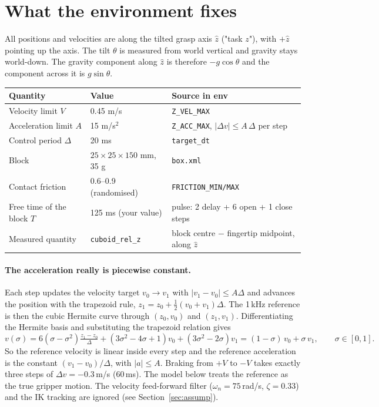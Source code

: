 \documentclass[11pt,a4paper]{article}
\newcommand{\code}[1]{\texttt{#1}}
\begin{document}
\section{What the environment fixes}
All positions and velocities are along the tilted grasp axis $\hat z$ ("task $z$"), with $+\hat z$ pointing up the axis.
The tilt $\theta$ is measured from world vertical and gravity stays world-down. The gravity component along $\hat z$
is therefore $-g\cos\theta$ and the component across it is $g\sin\theta$.

\begin{center}
\begin{tabular}{lll}
\toprule
Quantity & Value & Source in env \\
\midrule
Velocity limit $V$ & 0.45 m/s & \code{Z\_VEL\_MAX} \\
Acceleration limit $A$ & 15 m/s$^2$ & \code{Z\_ACC\_MAX}, $|\Delta v|\le A\,\Delta$ per step \\
Control period $\Delta$ & 20 ms & \code{target\_dt} \\
Block & $25\times25\times150$ mm, 35 g & \code{box.xml} \\
Contact friction & 0.6--0.9 (randomised) & \code{FRICTION\_MIN/MAX} \\
Free time of the block $T$ & 125 ms (your value) & pulse: 2 delay + 6 open + 1 close steps \\
Measured quantity & \code{cuboid\_rel\_z} & block centre $-$ fingertip midpoint, along $\hat z$ \\
\bottomrule
\end{tabular}
\end{center}

\paragraph{The acceleration really is piecewise constant.}
Each step updates the velocity target $v_0\to v_1$ with $|v_1-v_0|\le A\Delta$ and advances the position with the
trapezoid rule, $z_1=z_0+\tfrac12(v_0+v_1)\Delta$. The 1\,kHz reference is then the cubic Hermite curve through
$(z_0,v_0)$ and $(z_1,v_1)$. Differentiating the Hermite basis and substituting the trapezoid relation gives
\[
  v(\sigma) = 6(\sigma-\sigma^2)\tfrac{z_1-z_0}{\Delta} + (3\sigma^2-4\sigma+1)v_0 + (3\sigma^2-2\sigma)v_1
            = (1-\sigma)\,v_0 + \sigma\,v_1 ,\qquad \sigma\in[0,1].
\]
So the reference velocity is linear inside every step and the reference acceleration is the constant $(v_1-v_0)/\Delta$,
with $|a|\le A$. Braking from $+V$ to $-V$ takes exactly three steps of $\Delta v=-0.3$\,m/s (60\,ms).
The model below treats the reference as the true gripper motion. The velocity feed-forward filter
($\omega_n=75$\,rad/s, $\zeta=0.33$) and the IK tracking are ignored (see Section~\ref{sec:assump}).
\end{document}
